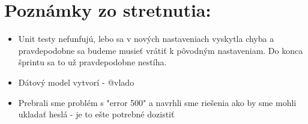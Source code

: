 \documentclass{article}
\begin{document}
    \section*{Poznámky zo stretnutia:}

    \begin{itemize}
        \item Unit testy nefunfujú, lebo sa v nových nastaveniach vyskytla chyba a pravdepodobne sa budeme musieť vrátiť k pôvodným nastaveniam. Do konca šprintu sa to už pravdepodobne nestíha. 
        \item Dátový model vytvorí - @vlado
        \item Prebrali sme problém s "error 500" a navrhli sme riešenia ako by sme mohli ukladať heslá - je to ešte potrebné dozistiť
    \end{itemize}
\end{document}
